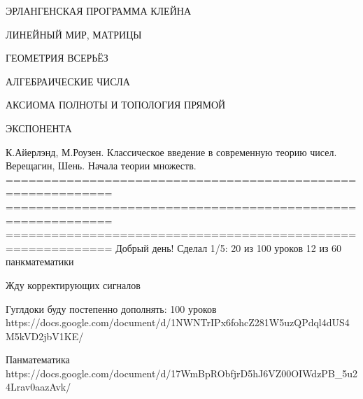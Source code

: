 ЭРЛАНГЕНСКАЯ ПРОГРАММА КЛЕЙНА

ЛИНЕЙНЫЙ МИР, МАТРИЦЫ

ГЕОМЕТРИЯ ВСЕРЬЁЗ

АЛГЕБРАИЧЕСКИЕ ЧИСЛА

АКСИОМА ПОЛНОТЫ И ТОПОЛОГИЯ ПРЯМОЙ

ЭКСПОНЕНТА

К.Айерлэнд, М.Роузен. Классическое введение в современную теорию чисел. Верещагин, Шень. Начала теории множеств.
============================================================
============================================================
============================================================
Добрый день!
Сделал 1/5:
20 из 100 уроков
12 из 60 панкматематики

Жду корректирующих сигналов

Гуглдоки буду постепенно дополнять:
100 уроков
https://docs.google.com/document/d/1NWNTrIPx6fohcZ281W5uzQPdql4dUS4M5kVD2jbV1KE/

Панматематика
https://docs.google.com/document/d/17WmBpRObfjrD5hJ6VZ00OIWdzPB_5u24Lrav0aazAvk/
